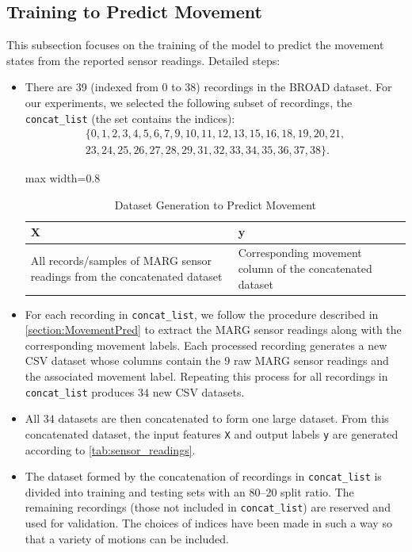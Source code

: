 \documentclass{iutbscthesis}
\begin{document}
\subsection{Training to Predict Movement}
This subsection focuses on the training of the model to predict the movement states from the reported sensor readings. Detailed steps:
\begin{itemize}
    \item There are 39 (indexed from 0 to 38) recordings in the BROAD dataset. For our experiments, we selected the following subset of recordings, the \texttt{concat\_list} (the set contains the indices):
    \begin{multline*}
    \{0,1,2,3,4,5,6,7,9,10,11,12,13,15,16,18,19,20,21, \\
    23,24,25,26,27,28,29,31,32,33,34,35,36,37,38\}.
    \end{multline*}
    \begin{table}[htbp]
    \centering
    \caption{Dataset Generation to Predict Movement}
    \label{tab:sensor_readings}
        \begin{adjustbox}{max width=0.8\textwidth}
            \begin{tabular}{| p{} | p{} |}
            \hline
            \textbf{X} & \textbf{y} \\
            \hline
            All records/samples of MARG sensor readings from the concatenated dataset & Corresponding movement column of the concatenated dataset \\
            \hline
            \end{tabular}
        \end{adjustbox}
    \end{table}

    \item For each recording in \texttt{concat\_list}, we follow the procedure described in \autoref{section:MovementPred} to extract the MARG sensor readings along with the corresponding movement labels. Each processed recording generates a new CSV dataset whose columns contain the $9$ raw MARG sensor readings and the associated movement label. Repeating this process for all recordings in \texttt{concat\_list} produces $34$ new CSV datasets.
    \item All $34$ datasets are then concatenated to form one large dataset. From this concatenated dataset, the input features \texttt{X} and output labels \texttt{y} are generated according to \autoref{tab:sensor_readings}.
    \item The dataset formed by the concatenation of recordings in \texttt{concat\_list} is divided into training and testing sets with an 80--20 split ratio. The remaining recordings (those not included in \texttt{concat\_list}) are reserved and used for validation. The choices of indices have been made in such a way so that a variety of motions can be included. 



\end{itemize}
\end{document}
